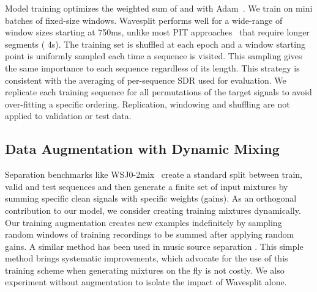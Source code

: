 \documentclass[letterpaper, onecolumn,10 pt]{IEEEtran}
\begin{document}
Model training optimizes the weighted sum of  and  with Adam~\cite{kingma14:adam}. We train on mini batches of fixed-size windows. Wavesplit performs well for a wide-range of window sizes starting at 750ms, unlike most PIT approaches~\cite{luo19:tasnet, luo2019:dualpathrnn, nachmani2020voice} that require longer segments ( 4s).
The training set is shuffled at each epoch and a window starting point is uniformly sampled each time a sequence is visited. This sampling gives the same importance to each sequence regardless of its length. This strategy is consistent with the averaging of per-sequence SDR used for evaluation. We replicate each training sequence for all permutations of the target signals to avoid over-fitting a specific ordering. Replication, windowing and shuffling are not applied to validation or test data.

\subsection{Data Augmentation with Dynamic Mixing}

Separation benchmarks
like WSJ0-2mix~\cite{hershey16:deep_clustering} create a standard split between train, valid and test sequences and then generate a finite set of input mixtures by summing specific clean signals with specific weights (gains). As an orthogonal contribution to our model, we consider creating training mixtures dynamically. Our training augmentation creates new examples indefinitely by sampling random windows of training recordings to be summed after applying random gains. A similar method has been used in music source separation \cite{uhlich17:musicaug, defossez19:musicaug}. This simple method brings systematic improvements, which advocate for the use of this training scheme when generating mixtures on the fly is not costly. We also experiment without augmentation to isolate the impact of Wavesplit alone.
\end{document}
